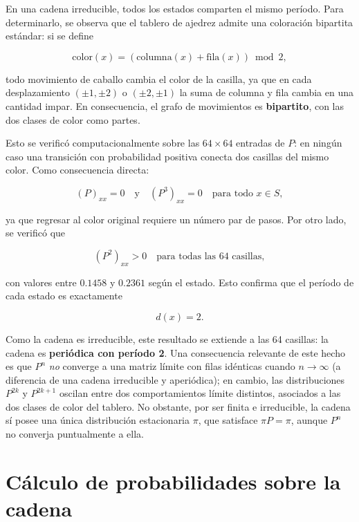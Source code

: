 \documentclass[12pt,a4paper]{article}
\begin{document}
En una cadena irreducible, todos los estados comparten el mismo
período. Para determinarlo, se observa que el tablero de ajedrez
admite una coloración bipartita estándar: si se define

\[
\text{color}(x)=(\text{columna}(x)+\text{fila}(x))\bmod 2,
\]

todo movimiento de caballo cambia el color de la casilla, ya que en
cada desplazamiento \((\pm1,\pm2)\) o \((\pm2,\pm1)\) la suma de
columna y fila cambia en una cantidad impar. En consecuencia, el grafo
de movimientos es \textbf{bipartito}, con las dos clases de color como
partes.

Esto se verificó computacionalmente sobre las \(64\times64\) entradas
de \(P\): en ningún caso una transición con probabilidad positiva
conecta dos casillas del mismo color. Como consecuencia directa:

\[
(P)_{xx}=0
\quad\text{y}\quad
(P^{3})_{xx}=0
\quad\text{para todo }x\in S,
\]

ya que regresar al color original requiere un número par de pasos. Por
otro lado, se verificó que

\[
(P^{2})_{xx}>0
\quad\text{para todas las 64 casillas},
\]

con valores entre \(0.1458\) y \(0.2361\) según el estado. Esto
confirma que el período de cada estado es exactamente

\[
d(x)=2.
\]

Como la cadena es irreducible, este resultado se extiende a las 64
casillas: la cadena es \textbf{periódica con período 2}. Una
consecuencia relevante de este hecho es que \(P^n\) \emph{no} converge
a una matriz límite con filas idénticas cuando \(n\to\infty\) (a
diferencia de una cadena irreducible y aperiódica); en cambio, las
distribuciones \(P^{2k}\) y \(P^{2k+1}\) oscilan entre dos
comportamientos límite distintos, asociados a las dos clases de color
del tablero. No obstante, por ser finita e irreducible, la cadena sí
posee una única distribución estacionaria \(\pi\), que satisface
\(\pi P=\pi\), aunque \(P^n\) no converja puntualmente a ella.


\section{Cálculo de probabilidades sobre la cadena}
\end{document}
